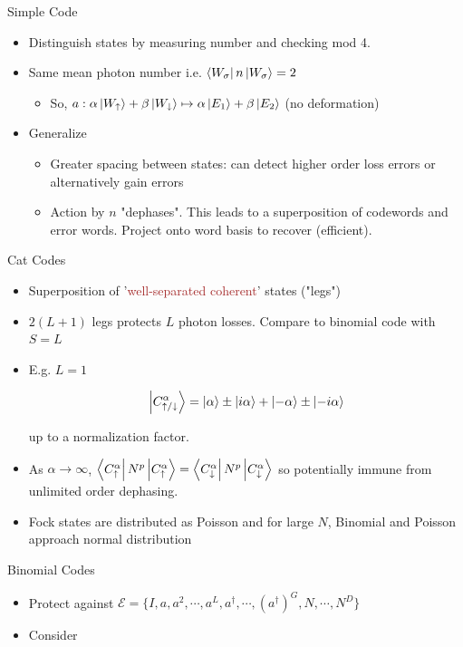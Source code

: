 \documentclass[8pt,final,hyperref={pdfpagelabels=false}]{beamer}
\theoremstyle{plain}
\newcommand\0{\mathbf{0}}
\begin{document}
\begin{frame}
\begin{columns}[t]
\begin{column}{.23\textwidth}
    \begin{block}{Simple Code }
      \begin{itemize}
      \item Distinguish states by measuring number and checking mod 4.
      \item Same mean photon number i.e. $\bra{W_\sigma} n \ket{W_\sigma} = 2$
\begin{itemize}
\item So, $a : \alpha\ket{W_\uparrow} + \beta\ket{W_\downarrow} \mapsto \alpha \ket{E_1} + \beta \ket{E_2}$ (no deformation)
\end{itemize}
\item Generalize
\begin{itemize}
\item Greater spacing between states: can detect higher order loss errors or alternatively gain errors
\item Action by $n$ "dephases". This leads to a superposition of codewords and error words. Project onto word basis to recover (efficient).
\end{itemize}
\end{itemize}
    \end{block} 
    
    \begin{block}{Cat Codes}
\begin{itemize}
\item Superposition of '\textcolor{brown}{well-separated coherent}' states ("legs")
\item $2(L+1)$ legs protects $L$ photon losses. Compare to binomial code with $S=L$
\item E.g. $L=1$

$$
\ket{C^\alpha_{\uparrow/\downarrow}} = \ket{\alpha} \pm \ket{i \alpha} + \ket{-\alpha} \pm \ket{-i \alpha} 
$$

up to a normalization factor.
\item As $\alpha \rightarrow \infty$, $\bra{C^\alpha_{\uparrow}} N^p \ket{C^\alpha_{\uparrow}} = \bra{C^\alpha_{\downarrow}} N^p \ket{C^\alpha_{\downarrow}}$ so potentially immune from unlimited order dephasing.
\item Fock states are distributed as Poisson and for large $N$, Binomial and Poisson approach normal distribution

\end{itemize}
    \end{block}
    
    \begin{block}{Binomial Codes}
\begin{itemize}
\normalsize
\item Protect against $\mathcal{E} = \{I, a, a^2, \cdots, a^L, a^\dag, \cdots, (a^\dag)^G, N, \cdots, N^D \}$
\item Consider


\end{itemize}
\end{block}
\end{column}
\end{columns}
\end{frame}
\end{document}

